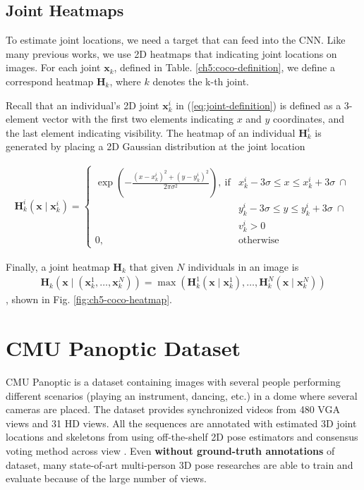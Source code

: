 \subsection{Joint Heatmaps}
To estimate joint locations, we need a target that can feed into the CNN. Like many previous works, we use 2D heatmaps that indicating joint locations on images. For each joint $\mathbf{x}_k$, defined in Table. \ref{ch5:coco-definition}, we define a correspond heatmap $\mathbf{H}_k$, where $k$ denotes the k-th joint.

Recall that an individual's 2D joint $\mathbf{x}_k^i$ in (\ref{eq:joint-definition}) is defined as a 3-element vector with the first two elements indicating $x$ and $y$ coordinates, and the last element indicating visibility. The heatmap of an individual $\mathbf{H}_k^i$ is generated by placing a 2D Gaussian distribution at the joint location

\begin{gather}
\mathbf{H}_k^i(\mathbf{x}\mid\mathbf{x}_k^i) = 
\begin{cases}
\exp\left(-\frac{(x-x_k^i)^2 + (y-y_k^i)^2}{2\pi\sigma^2}\right),\ \text{if} & 
x_k^i - 3\sigma \leq x \leq x_k^i + 3\sigma \ \cap \\ 
& y_k^i - 3\sigma \leq y \leq y_k^i + 3\sigma \ \cap \\
& v_k^i > 0 \\
0, & \text{otherwise}
\end{cases}
\label{eq:joint-definition}
\end{gather}

Finally, a joint heatmap $\mathbf{H}_k$ that given $N$ individuals in an image is
\begin{gather}
\mathbf{H}_k(\mathbf{x}\mid(\mathbf{x}_k^1, \dots,  \mathbf{x}_k^N)) = 
\max \left(\mathbf{H}_k^1(\mathbf{x}\mid\mathbf{x}_k^1), \dots, \mathbf{H}_k^N(\mathbf{x}\mid\mathbf{x}_k^N)\right)
\label{eq:joint-definition}
\end{gather}
, shown in Fig. \ref{fig:ch5-coco-heatmap}.

\section{CMU Panoptic Dataset}
CMU Panoptic \cite{cmu-panoptic} is a dataset containing images with several people performing different scenarios (playing an instrument, dancing, etc.) in a dome
where several cameras are placed. The dataset provides synchronized videos from 480 VGA views and 31 HD views. All the sequences are annotated with estimated 3D joint locations and skeletons from using off-the-shelf 2D pose estimators and consensus voting method across view \cite{cmu-panoptic}. Even \textbf{without ground-truth annotations} of dataset, many state-of-art multi-person 3D pose researches \cite{voxelpose,Chen_2020_CVPR,20204DAssociation,iskakov2019learnable} are able to train and evaluate because of the large number of views.

